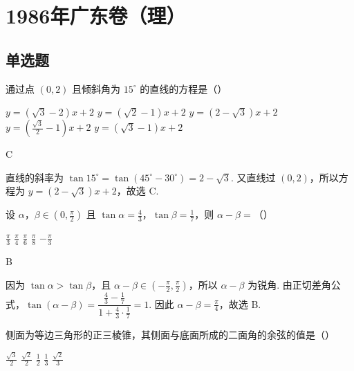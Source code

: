 \chapter{1986年广东卷（理）}

\section{单选题}


\begin{problem}

通过点 \((0,2)\) 且倾斜角为 \(15^{\circ}\) 的直线的方程是（\quad）

\choicesfive
    {\(y=\left(\sqrt{3}-2\right)x+2 \)}
    {\(y=\left(\sqrt{2}-1\right)x+2 \)}
    {\(y=\left(2-\sqrt{3}\right)x+2 \)}
    {\(y=\left(\frac{\sqrt{3}}{2}-1\right)x+2 \)}
    {\(y=\left(\sqrt{3}-1\right)x+2 \)}
\end{problem}

\begin{answer}
C
\end{answer}

\begin{solution}
直线的斜率为 \(\tan15^{\circ}=\tan(45^{\circ}-30^{\circ})=2-\sqrt{3}\). 又直线过 \((0,2)\)，所以方程为 \(y=(2-\sqrt{3})x+2\)，故选 C.
\end{solution}

\begin{problem}

设 \(\alpha\)，\(\beta \in \left(0, \frac{\pi}{2}\right)\) 且 \(\tan\alpha = \frac{4}{3} \)，\(\tan\beta = \frac{1}{7} \)，则 \(\alpha - \beta = \)（\quad）

\choicesfive
    {\(\frac{\pi}{3} \)}
    {\(\frac{\pi}{4} \)}
    {\(\frac{\pi}{6} \)}
    {\(\frac{\pi}{8} \)}
    {\(-\frac{\pi}{3} \)}
\end{problem}

\begin{answer}
B
\end{answer}

\begin{solution}
因为 \(\tan\alpha>\tan\beta\)，且 \(\alpha-\beta\in\left(-\frac{\pi}{2},\frac{\pi}{2}\right)\)，所以 \(\alpha-\beta\) 为锐角. 由正切差角公式，\(\tan(\alpha-\beta)=\dfrac{\frac{4}{3}-\frac{1}{7}}{1+\frac{4}{3}\cdot\frac{1}{7}}=1\). 因此 \(\alpha-\beta=\frac{\pi}{4}\)，故选 B.
\end{solution}

\begin{problem}

侧面为等边三角形的正三棱锥，其侧面与底面所成的二面角的余弦的值是（\quad）

\choicesfive
    {\(\frac{\sqrt{3}}{2} \)}
    {\(\frac{\sqrt{2}}{2} \)}
    {\(\frac{1}{2} \)}
    {\(\frac{1}{3} \)}
    {\(\frac{\sqrt{2}}{3} \)}
\end{problem}

